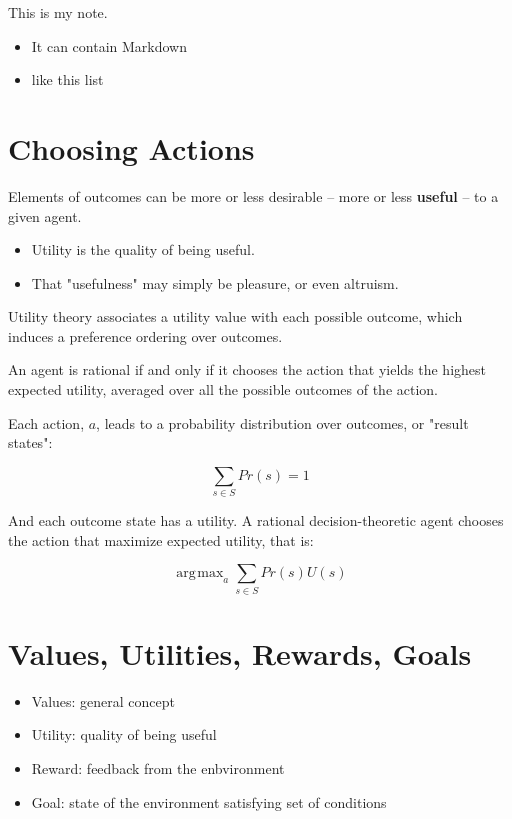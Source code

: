 \documentclass[11pt]{article}
\renewenvironment{quote}{\begin{shaded*}\begin{oldquote}}{\end{oldquote}\end{shaded*}}
\DeclareMathOperator*{\argmax}{arg\!max}
\begin{document}
This is my note.

\begin{itemize}
\item It can contain Markdown
\item like this list
\end{itemize}
\section{Choosing Actions}
\label{sec:org3516612}

Elements of outcomes can be more or less desirable -- more or less \textbf{useful} -- to a given agent.

\begin{itemize}
\item Utility is the quality of being useful.
\item That "usefulness" may simply be pleasure, or even altruism.
\end{itemize}

Utility theory associates a utility value with each possible outcome, which induces a preference ordering over outcomes.

\begin{quote}
An agent is rational if and only if it chooses the action that yields the highest expected utility, averaged over all the possible outcomes of the action.
\end{quote}

Each action, \(a\), leads to a probability distribution over outcomes, or "result states":

$$
\sum_{s \in S} Pr(s) = 1
$$

And each outcome state has a utility.  A rational decision-theoretic agent chooses the action that maximize expected utility, that is:

$$
\argmax_{a} \sum_{s \in S} Pr(s) U(s)
$$
\section{Values, Utilities, Rewards, Goals}
\label{sec:orga249bb9}

\begin{itemize}
\item Values: general concept
\item Utility: quality of being useful
\item Reward: feedback from the enbvironment
\item Goal: state of the environment satisfying set of conditions
\end{itemize}
\end{document}
